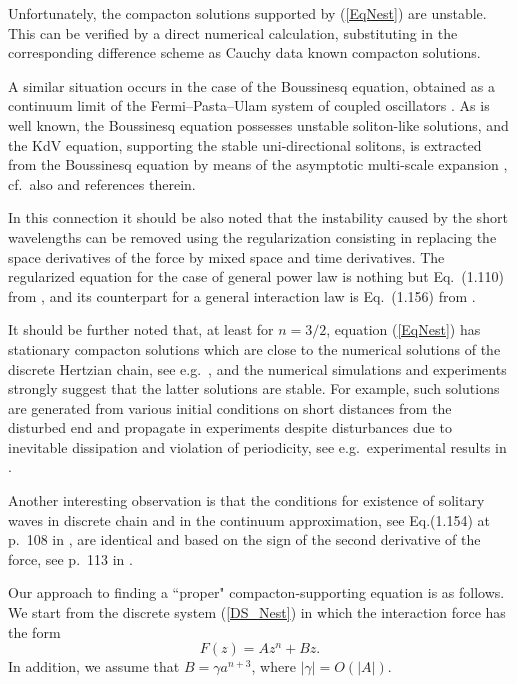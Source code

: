 \documentclass[12pt]{article}
\begin{document}
Unfortunately, the compacton solutions supported by (\ref{EqNest}) are unstable.
This can be verified by a direct numerical calculation, substituting in the corresponding difference scheme as Cauchy data known compacton solutions. 

A similar situation occurs in the case of the Boussinesq equation, obtained as a continuum limit of the Fermi--Pasta--Ulam  system of coupled oscillators \cite{Dodd}. As is well known, the  Boussinesq equation possesses unstable soliton-like solutions, and the KdV equation,
supporting the stable uni-directional solitons, is extracted from the Boussinesq equation by means of the asymptotic multi-scale expansion \cite{Dodd}, cf.\ also \cite{burde-s} and references therein.

In this connection it should be also noted that the instability caused by the short wavelengths can be removed using the regularization consisting in replacing the space derivatives of the force by mixed space and time derivatives.  The regularized equation for the case of general power law is nothing but Eq.~(1.110) from \cite{Nester_02}, and its counterpart for a general interaction law is Eq.~(1.156) from \cite{Nester_02}.



It should be further noted that, at least for $n=3/2$, equation (\ref{EqNest}) has stationary compacton solutions which are close to the numerical solutions of the discrete Hertzian chain, see e.g.\ \cite{Ahnert_09}, and the numerical simulations and experiments strongly suggest that the latter solutions are stable. For example, such solutions are generated from various initial conditions on short distances from the disturbed end and propagate in experiments despite disturbances due to inevitable dissipation and violation of periodicity, see e.g.\ experimental results in \cite{Nester_02}.

Another interesting observation is that the conditions for existence of solitary waves in discrete chain \cite{FW} and in the continuum approximation, see Eq.(1.154) at p.~108 in \cite{Nester_02}, are identical and based on the sign of the second derivative of the force, see p.~113 in \cite{Nester_02}.

Our approach to finding a ``proper" compacton-supporting equation is as follows.
We start from the  discrete system (\ref{DS_Nest}) in which the interaction force has the form
\begin{equation}\label{Forceint}
F(z)=A  z^n+B z.
\end{equation}
In addition, we assume that  $B=\gamma a^{n+3}$, where $|\gamma|=O(|A|)$.
\end{document}
